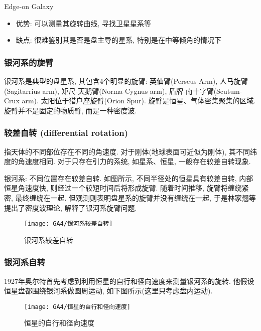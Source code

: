 Edge-on Galaxy
\begin{itemize}\small
    \item 优势: 可以测量其旋转曲线, 寻找卫星星系等
    \item 缺点: 很难鉴别其是否是盘主导的星系, 特别是在中等倾角的情况下
\end{itemize}

\subsubsection{银河系的旋臂}
银河系是典型的盘星系, 其包含4个明显的旋臂: 英仙臂(Perseus Arm), 人马旋臂(Sagitarrius arm), 矩尺-天鹅臂(Norma-Cygnus arm), 盾牌-南十字臂(Scutum-Crux arm). 太阳位于猎户座旋臂(Orion Spur). 旋臂是恒星、气体密集聚集的区域. 旋臂并不是固定的物质臂, 而是一种密度波. 

\subsubsection{较差自转 (differential rotation)}
指天体的不同部位存在不同的角速度. 对于刚体(地球表面可近似为刚体), 其不同纬度的角速度相同. 对于只存在引力的系统, 如星系、恒星, 一般存在较差自转现象. 

银河系: 不同位置存在较差自转. 如图所示, 不同半径处的恒星具有较差自转, 内部恒星角速度快, 则经过一个较短时间后将形成旋臂. 随着时间推移, 旋臂将缠绕紧密, 最终缠绕在一起. 但观测则表明盘星系的旋臂并没有缠绕在一起, 于是林家翘等提出了密度波理论, 解释了银河系旋臂问题. 

\begin{figure}[!htb]
    \centering
    \texttt{[image: GA4/银河系较差自转]}
    \caption{银河系较差自转}
\end{figure}


\subsubsection{银河系自转}
1927年奥尔特首先考虑到利用恒星的自行和径向速度来测量银河系的旋转. 他假设恒星盘都围绕银河系做圆周运动, 如下图所示(这里只考虑盘内运动). 

\begin{figure}[!htb]
    \centering
    \texttt{[image: GA4/恒星的自行和径向速度]}
    \caption{恒星的自行和径向速度}
\end{figure}

